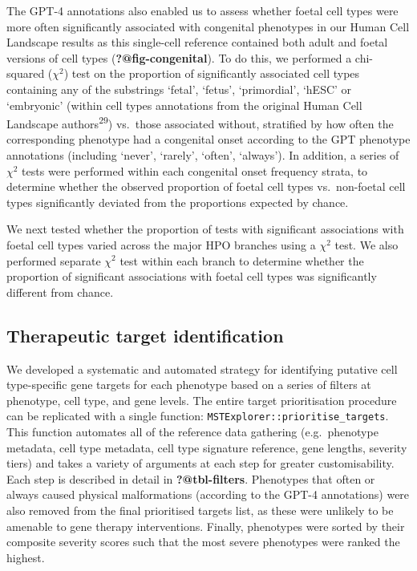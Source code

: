 \documentclass[
]{report}
\begin{document}
The GPT-4 annotations also enabled us to assess whether foetal cell
types were more often significantly associated with congenital
phenotypes in our Human Cell Landscape results as this single-cell
reference contained both adult and foetal versions of cell types
(\textbf{?@fig-congenital}). To do this, we performed a chi-squared
(\(\chi^2\)) test on the proportion of significantly associated cell
types containing any of the substrings `fetal', `fetus', `primordial',
`hESC' or `embryonic' (within cell types annotations from the original
Human Cell Landscape authors\textsuperscript{29}) vs.~those associated
without, stratified by how often the corresponding phenotype had a
congenital onset according to the GPT phenotype annotations (including
`never', `rarely', `often', `always'). In addition, a series of
\(\chi^2\) tests were performed within each congenital onset frequency
strata, to determine whether the observed proportion of foetal cell
types vs.~non-foetal cell types significantly deviated from the
proportions expected by chance.

We next tested whether the proportion of tests with significant
associations with foetal cell types varied across the major HPO branches
using a \(\chi^2\) test. We also performed separate \(\chi^2\) test
within each branch to determine whether the proportion of significant
associations with foetal cell types was significantly different from
chance.

\subsection{Therapeutic target
identification}\label{therapeutic-target-identification-1}

We developed a systematic and automated strategy for identifying
putative cell type-specific gene targets for each phenotype based on a
series of filters at phenotype, cell type, and gene levels. The entire
target prioritisation procedure can be replicated with a single
function: \texttt{MSTExplorer::prioritise\_targets}. This function
automates all of the reference data gathering (e.g.~phenotype metadata,
cell type metadata, cell type signature reference, gene lengths,
severity tiers) and takes a variety of arguments at each step for
greater customisability. Each step is described in detail in
\textbf{?@tbl-filters}. Phenotypes that often or always caused physical
malformations (according to the GPT-4 annotations) were also removed
from the final prioritised targets list, as these were unlikely to be
amenable to gene therapy interventions. Finally, phenotypes were sorted
by their composite severity scores such that the most severe phenotypes
were ranked the highest.
\end{document}
